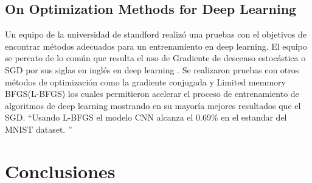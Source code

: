 \subsection{On Optimization Methods for Deep Learning}
Un equipo de la universidad de standford realizó una pruebas con el objetivos de encontrar métodos adecuados para un entrenamiento en deep learning. El equipo se percato de lo común que resulta el uso de Gradiente de descenso estocástica o SGD por sus siglas en inglés en deep learning . Se realizaron pruebas con otros métodos de optimización como la gradiente conjugada y Limited memmory BFGS(L-BFGS) los cuales permitieron acelerar el proceso de entrenamiento de algoritmos de deep learning mostrando en su mayoría mejores resultados que el SGD. \textquotedblleft Usando L-BFGS el modelo CNN alcanza el 0.69\%  en el estandar del MNIST dataset. \textquotedblright
\section{Conclusiones}


